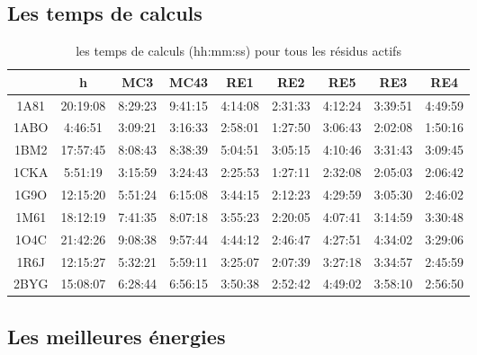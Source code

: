 \documentclass[a4paper,12pt]{article}
\begin{document}
   \subsection{Les temps de calculs} 

    \begin{table}[!htbp]
      \centering

      \begin{tabular}{|c|c|c|c|c|c|c|c|c|}

 
        \hline
        & h & MC3 & MC43 & RE1 & RE2 & RE5 & RE3 & RE4 \\
        \hline
        1A81 & 20:19:08 & 8:29:23 & 9:41:15 & 4:14:08 & 2:31:33 & 4:12:24 & 3:39:51 & 4:49:59 \\
        1ABO & 4:46:51 & 3:09:21 & 3:16:33 & 2:58:01 & 1:27:50 & 3:06:43 & 2:02:08 & 1:50:16 \\
        1BM2 & 17:57:45 & 8:08:43 & 8:38:39 & 5:04:51 & 3:05:15 & 4:10:46 & 3:31:43 & 3:09:45 \\
        1CKA & 5:51:19 & 3:15:59 & 3:24:43 & 2:25:53 & 1:27:11 & 2:32:08 & 2:05:03 & 2:06:42 \\
        1G9O & 12:15:20 & 5:51:24 & 6:15:08 & 3:44:15 & 2:12:23 & 4:29:59 & 3:05:30 & 2:46:02 \\
        1M61 & 18:12:19 & 7:41:35 & 8:07:18 & 3:55:23 & 2:20:05 & 4:07:41 & 3:14:59 & 3:30:48 \\
        1O4C & 21:42:26 & 9:08:38 & 9:57:44 & 4:44:12 & 2:46:47 & 4:27:51 & 4:34:02 & 3:29:06 \\
        1R6J & 12:15:27 & 5:32:21 & 5:59:11 & 3:25:07 & 2:07:39 & 3:27:18 & 3:34:57 & 2:45:59 \\
        2BYG & 15:08:07 & 6:28:44 & 6:56:15 & 3:50:38 & 2:52:42 & 4:49:02 & 3:58:10 & 2:56:50 \\

\hline

      \end{tabular}      
      \caption{les temps de calculs (hh:mm:ss) pour tous les résidus actifs}
      \label{tab_temps_all}      
    \end{table}


   \subsection{Les meilleures énergies} 
\end{document}
